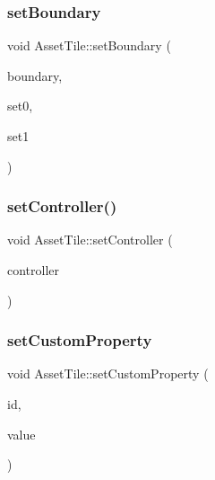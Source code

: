 \subsubsection{\texorpdfstring{set\+Boundary}{setBoundary}}
{\footnotesize\ttfamily void Asset\+Tile\+::set\+Boundary (\begin{DoxyParamCaption}\item[{\mbox{\hyperlink{ioapi_8h_a787fa3cf048117ba7123753c1e74fcd6}{int}}}]{boundary,  }\item[{\mbox{\hyperlink{ioapi_8h_a787fa3cf048117ba7123753c1e74fcd6}{int}}}]{set0,  }\item[{\mbox{\hyperlink{ioapi_8h_a787fa3cf048117ba7123753c1e74fcd6}{int}}}]{set1 }\end{DoxyParamCaption})\hspace{0.3cm}{\ttfamily [slot]}}

\mbox{\label{class_q_g_b_a_1_1_asset_tile_ae8f4c831a1523553c63c5c293e04fa1d}} 
\subsubsection{\texorpdfstring{set\+Controller()}{setController()}}
{\footnotesize\ttfamily void Asset\+Tile\+::set\+Controller (\begin{DoxyParamCaption}\item[{std\+::shared\+\_\+ptr$<$ \mbox{\hyperlink{class_q_g_b_a_1_1_core_controller}{Core\+Controller}} $>$}]{controller }\end{DoxyParamCaption})}

\mbox{\label{class_q_g_b_a_1_1_asset_tile_a6e1643078cf669ece8a87799b7ed5cfa}} 
\subsubsection{\texorpdfstring{set\+Custom\+Property}{setCustomProperty}}
{\footnotesize\ttfamily void Asset\+Tile\+::set\+Custom\+Property (\begin{DoxyParamCaption}\item[{const Q\+String \&}]{id,  }\item[{const Q\+Variant \&}]{value }\end{DoxyParamCaption})\hspace{0.3cm}{\ttfamily [slot]}}

